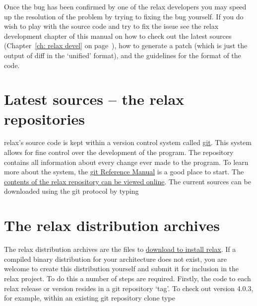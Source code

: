 Once the bug has been confirmed by one of the relax developers you may speed up the resolution of the problem by trying to fixing the bug yourself.
If you do wish to play with the source code and try to fix the issue see the relax development chapter of this manual on how to check out the latest sources (Chapter~\ref{ch: relax devel} on page~\pageref{ch: relax devel}), how to generate a patch (which is just the output of diff in the `unified' format), and the guidelines for the format of the code.




\section{Latest sources -- the relax repositories}

relax's source code is kept within a version control system called \href{https://git-scm.com/}{git}.
This system allows for fine control over the development of the program.
The repository contains all information about every change ever made to the program.
To learn more about the system, the \href{https://git-scm.com/docs}{git Reference Manual} is a good place to start.
The \href{\relaxCodeWebInterfaceURL}{contents of the relax repository can be viewed online}.
The current sources can be downloaded using the git protocol by typing





\section{The relax distribution archives}

The relax distribution archives are the files to \href{\relaxDistributionURL}{download to install relax}.
If a compiled binary distribution for your architecture does not exist, you are welcome to create this distribution yourself and submit it for inclusion in the relax project.
To do this a number of steps are required.
Firstly, the code to each relax release or version resides in a git repository `tag'.
To check out version 4.0.3, for example, within an existing git repository clone type

